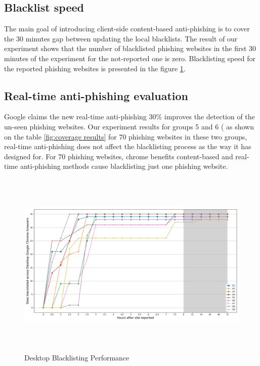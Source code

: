 \subsection{Blacklist speed}
The main goal of introducing client-side content-based anti-phishing is to cover the 30 minutes gap between updating the local blacklists. The result of our experiment shows that the number of blacklisted phishing websites in the first 30 minutes of the experiment for the not-reported one is zero.
Blacklisting speed for the reported phishing websites is presented in the figure \ref{Blacklisting speed results}. 

\subsection{Real-time anti-phishing evaluation}

Google claims the new real-time anti-phishing 30\%  improves the detection of the un-seen phishing websites. Our experiment results for groups 5 and 6 ( as shown on the table \ref{fig:coverage results} for 70 phishing websites in these two groups, real-time anti-phishing does not affect the blacklisting process as the way it has designed for. For 70 phishing websites, chrome benefits content-based and real-time anti-phishing methods cause blacklisting just one phishing website.

\begin{figure}[t]
  \includegraphics[width=\textwidth,height=9cm]{figures/DesktopBlacklistSpeed.png}
  \caption{Desktop Blacklisting Performance}
  \label{Blacklisting speed results}
\end{figure}


